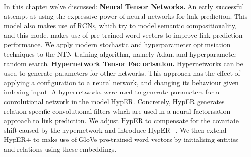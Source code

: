 In this chapter we've discussed: \newline
\textbf{Neural Tensor Networks.} An early successful attempt at using the expressive power of neural networks for link prediction. This model also makes use of RCNs, which try to model semantic compositionality, and this model makes use of pre-trained word vectors to improve link prediction performance. We apply modern stochastic and hyperparameter optimsiation techniques to the NTN training algorithm, namely Adam and hyperparameter random search. \newpage
\textbf{Hypernetwork Tensor Factorisation.}  Hypernetworks can be used to generate parameters for other networks. This approach has the effect of applying a configuration to a neural network, and changing its behaviour given indexing input. A hypernetworks were used to generate parameters for a convolutional network in the model HypER. Concretely, HypER generates relation-specific convolutional filters which are used in a neural factorisation approach to link prediction. We adjust HypER to compensate for the covariate shift caused by the hypernetwork and introduce HypER+. We then extend HypER+ to make use of GloVe pre-trained word vectors by initialising entities and relations using these embeddings. \newline
